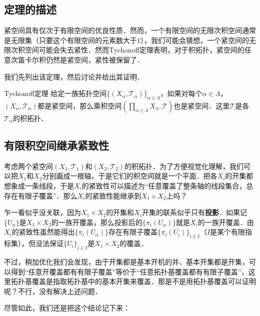 

\subsection{定理的描述}

紧空间具有仅次于有限空间的优良性质．然而，一个有限空间的无限次积空间通常是无限集（只要这个有限空间的元素数大于$1$），我们可能会猜想，一个紧空间的无限次积空间可能会失去紧性．然而Tychonoff定理表明，对于积拓扑，紧空间的任意次笛卡尔积仍然是紧空间，紧性被保留了．

我们先列出该定理，然后讨论并给出其证明．

\begin{theorem}{Tychonoff定理}
给定一族拓扑空间$\{(X_\alpha, \mathcal{T}_\alpha)\}_{\alpha\in \Lambda}$，如果对每个$\alpha\in\Lambda$，$(X_\alpha, \mathcal{T}_\alpha)$都是紧空间，那么乘积空间$(\prod_{\alpha\in\Lambda}X_\alpha, \mathcal{T})$也是紧空间．这里$\mathcal{T}$是各$\mathcal{T}_\alpha$的积拓扑．
\end{theorem}



\subsection{有限积空间继承紧致性}

考虑两个紧空间$(X_1, \mathcal{T}_1)$和$(X_2, \mathcal{T}_2)$的积拓扑．为了方便视觉化理解，我们可以把$X_1$和$X_2$分别画成一根轴，于是它们的积空间就是一个平面．把各$X_i$的开集都想象成一条线段，于是$X_i$的紧致性可以描述为“任意覆盖了整条轴的线段集合，总存在有限子覆盖”．那么$X_i$的紧致性能继承到$X_1\times X_2$上吗？

乍一看似乎没关联，因为$X_1\times X_2$的开集和$X_i$开集的联系似乎只有\textbf{投影}．如果记$\{U_\alpha\}$是$X_1\times X_2$的一族开覆盖，那么投影后的$\{\pi_i(U_\alpha)\}$就是$X_i$的一族开覆盖．由$X_i$的紧致性虽然能得出$\{\pi_i(U_\alpha)\}$存在有限子覆盖$\{\pi_i(U_i)\}_{i\in I}$（$I$是某个有限指标集），但没法保证$\{U_i\}_{i\in I}$是$X_1\times X_2$的覆盖．

不过，稍加优化我们会发现，由于开集都是基本开机的并、基本开集都是开集，可以得到“任意开覆盖都有有限子覆盖”等价于“任意拓扑基覆盖都有有限子覆盖”，这里拓扑基覆盖是指取拓扑基中的基本开集来覆盖．那是不是用拓扑基覆盖可以证明呢？不行，没有解决上述问题．

尽管如此，我们还是把这个结论记下来：

